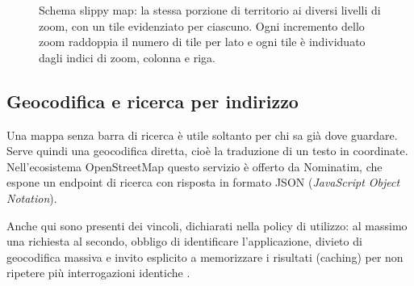 \begin{figure}[H]
\centering
{}
\caption{Schema slippy map: la stessa porzione di territorio ai diversi livelli di zoom, con un tile evidenziato per ciascuno.
Ogni incremento dello zoom raddoppia il numero di tile per lato e ogni tile è individuato dagli indici di zoom, colonna e riga.}
\label{fig:tasselli}
\end{figure}

\subsection{Geocodifica e ricerca per indirizzo}\label{subsec:geocodifica}

Una mappa senza barra di ricerca è utile soltanto per chi sa già dove guardare.
Serve quindi una geocodifica diretta, cioè la traduzione di un testo in coordinate. %
Nell'ecosistema OpenStreetMap questo servizio è offerto da Nominatim, che espone un endpoint di ricerca con risposta in formato JSON (\textit{JavaScript Object Notation})\@.

Anche qui sono presenti dei vincoli, dichiarati nella policy di utilizzo: al massimo una richiesta al secondo, obbligo di identificare l'applicazione,
divieto di geocodifica massiva e invito esplicito a memorizzare i risultati (caching) per non ripetere più interrogazioni identiche \cite{nominatimPolicy}.


